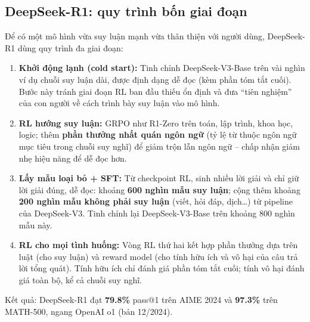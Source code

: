 \subsection{DeepSeek-R1: quy trình bốn giai đoạn}
\label{ssec:r1_pipeline}
Để có một mô hình vừa suy luận mạnh vừa thân thiện với người dùng, DeepSeek-R1 dùng quy trình đa giai đoạn:
\begin{enumerate}
	\item \textbf{Khởi động lạnh (cold start):} Tinh chỉnh DeepSeek-V3-Base trên vài nghìn ví dụ chuỗi suy luận dài, được định dạng dễ đọc (kèm phần tóm tắt cuối). Bước này tránh giai đoạn RL ban đầu thiếu ổn định và đưa “tiên nghiệm” của con người về cách trình bày suy luận vào mô hình.
	\item \textbf{RL hướng suy luận:} GRPO như R1-Zero trên toán, lập trình, khoa học, logic; thêm \textbf{phần thưởng nhất quán ngôn ngữ} (tỷ lệ từ thuộc ngôn ngữ mục tiêu trong chuỗi suy nghĩ) để giảm trộn lẫn ngôn ngữ -- chấp nhận giảm nhẹ hiệu năng để dễ đọc hơn.
	\item \textbf{Lấy mẫu loại bỏ + SFT:} Từ checkpoint RL, sinh nhiều lời giải và chỉ giữ lời giải đúng, dễ đọc: khoảng \textbf{600 nghìn mẫu suy luận}; cộng thêm khoảng \textbf{200 nghìn mẫu không phải suy luận} (viết, hỏi đáp, dịch\ldots) từ pipeline của DeepSeek-V3. Tinh chỉnh lại DeepSeek-V3-Base trên khoảng 800 nghìn mẫu này.
	\item \textbf{RL cho mọi tình huống:} Vòng RL thứ hai kết hợp phần thưởng dựa trên luật (cho suy luận) và reward model (cho tính hữu ích và vô hại của câu trả lời tổng quát). Tính hữu ích chỉ đánh giá phần tóm tắt cuối; tính vô hại đánh giá toàn bộ, kể cả chuỗi suy nghĩ.
\end{enumerate}
Kết quả: DeepSeek-R1 đạt \textbf{79.8\%} pass@1 trên AIME 2024 và \textbf{97.3\%} trên MATH-500, ngang OpenAI o1 (bản 12/2024).

\begin{center}
\label{fig:r1_pipeline}
\end{center}


